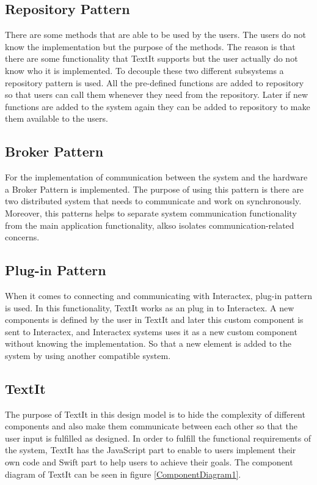 \subsection{Repository Pattern}
There are some methods that are able to be used by the users. The users do not know the implementation but the purpose of the methods. The reason is that there are some functionality that TextIt supports but the user actually do not know who it is implemented. To decouple these two different subsystems a repository pattern is used. All the pre-defined functions are added to repository so that users can call them whenever they need from the repository. Later if new functions are added to the system again they can be added to repository to make them available to the users. 

\subsection{Broker Pattern}
For the implementation of communication between the system and the hardware a Broker Pattern is implemented. The purpose of using this pattern is there are two distributed system that needs to communicate and work on synchronously. Moreover, this patterns helps to separate system communication functionality from the main application functionality, alkso isolates communication-related concerns.

\subsection{Plug-in Pattern}
When it comes to connecting and communicating with Interactex, plug-in pattern is used. In this functionality, TextIt works as an plug in to Interactex. A new components is defined by the user in TextIt and later this custom component is sent to Interactex, and Interactex systems uses it as a new custom component without knowing the implementation. So that a new element is added to the system by using another compatible system.  

\subsection{TextIt}
The purpose of TextIt in this design model is to hide the complexity of different components and also make them communicate between each other so that the user input is fulfilled as designed. In order to fulfill the functional requirements of the system, TextIt has the JavaScript part to enable to users implement their own code and Swift part to help users to achieve their goals. The component diagram of TextIt can be seen in figure \ref{ComponentDiagram1}.

